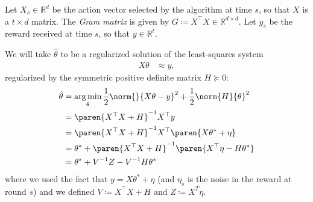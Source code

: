 \documentclass{article}
\newcommand{\defeq}{\coloneq}
\newcommand{\inv}[1]{#1^{-1}}
\newcommand{\Real}{\mathds{R}}
\newcommand{\argmin}{\operatorname*{arg\,min}}
\DeclarePairedDelimiter{\paren}()
\providecommand\transp{\top}
\let\transpsymbol\transp
\renewcommand{\transp}[1]{#1^\transpsymbol}
\begin{document}
Let $X_s \in \Real^d$ be the action vector selected by the algorithm at
time $s$, so that $X$ is a $t \times d$ matrix.  The \emph{Gram matrix} is given by
$G \defeq \transp{X}X \in \Real^{d \times d}$.  Let $y_s$ be the
reward received at time $s$, so that $y\in\Real^t$.

We will take $\hat{\theta}$ to be a regularized solution of the
least-squares system
\begin{align*}
  X\theta &\approx y,
\end{align*}
regularized by the symmetric positive definite matrix $H \succeq 0$:
\begin{align*}
  \hat{\theta} &= \argmin_\theta \frac{1}{2}\norm{}{X\theta - y}^2 + \frac{1}{2}\norm{H}{\theta}^2 \\
               &= \inv{\paren{\transp{X}X + H}} \transp{X}y \\
               &= \inv{\paren{\transp{X}X + H}} \transp{X} \paren{X\theta^* + \eta} \\
               &= \theta^* + \inv{\paren{\transp{X}X + H}}\paren{\transp{X}\eta - H\theta^*} \\
               &= \theta^* + \inv{V}Z - \inv{V}H\theta^*
\end{align*}
where we used the fact that $y = X\theta^* + \eta$ (and $\eta_s$ is the
noise in the reward at round $s$) and we defined $V \defeq \transp{X}X
+ H$ and $Z\defeq X^T\eta$.
\end{document}
